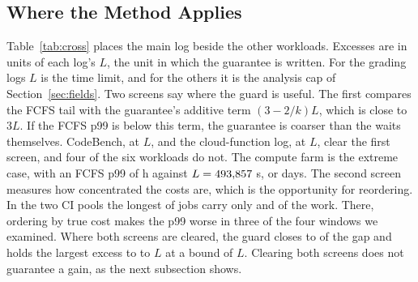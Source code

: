 \subsection{Where the Method Applies}
\label{sec:exp_cross}

Table~\ref{tab:cross} places the main log beside the other workloads. Excesses are in units
of each log's $L$, the unit in which the guarantee is written. For the grading logs $L$ is
the time limit, and for the others it is the analysis cap of Section~\ref{sec:fields}. Two screens say
where the guard is useful. The first compares the FCFS tail with the guarantee's additive
term $(3-2/k)L$, which is close to $3L$. If the FCFS p99 is below this term, the guarantee
is coarser than the waits themselves. CodeBench, at $L$, and the cloud-function
log, at $L$, clear the first screen, and four of the six workloads do not. The
compute farm is the extreme case, with an FCFS p99 of  h against $L =
493{,}857$ s, or  days. The second screen measures how concentrated the
costs are, which is the opportunity for reordering. In the two CI pools the longest
 of jobs carry only  and  of the work. There,
ordering by true cost makes the p99 worse in three of the four windows we examined. Where
both screens are cleared, the guard closes  to  of the gap and
holds the largest excess to  to $L$ at a bound of $L$.
Clearing both screens does not guarantee a gain, as the next subsection shows.

